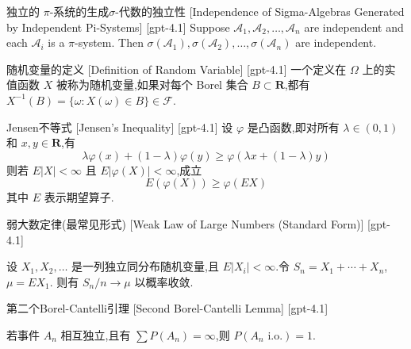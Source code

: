 \documentclass[UTF8]{ctexart}
\begin{document}
    
    
    \begin{thm}
        {独立的 $\pi$-系统的生成$\sigma$-代数的独立性}
        [Independence of Sigma-Algebras Generated by Independent Pi-Systems]
        [gpt-4.1]
        Suppose $\mathcal{A}_1, \mathcal{A}_2, \ldots, \mathcal{A}_n$ are independent and each $\mathcal{A}_i$ is a $\pi$-system. Then $\sigma(\mathcal{A}_1), \sigma(\mathcal{A}_2), \ldots, \sigma(\mathcal{A}_n)$ are independent.
    \end{thm}
    
    
    
    \begin{dfn}
        {随机变量的定义}
        [Definition of Random Variable]
        [gpt-4.1]
        一个定义在 $\Omega$ 上的实值函数 $X$ 被称为随机变量,如果对每个 Borel 集合 $B \subset \mathbf{R}$,都有 $X^{-1}(B) = \{\omega : X(\omega) \in B\} \in {\mathcal{F}}$.
    \end{dfn}
    
    
    
    \begin{thm}
        {Jensen不等式}
        [Jensen's Inequality]
        [gpt-4.1]
        设 $\varphi$ 是凸函数,即对所有 $\lambda \in (0, 1)$ 和 $x, y \in \mathbf{R}$,有
\[
\lambda \varphi(x) + (1 - \lambda)\varphi(y) \geq \varphi(\lambda x + (1 - \lambda)y)
\]
则若 $E|X| < \infty$ 且 $E|\varphi(X)| < \infty$,成立
\[
E(\varphi(X)) \geq \varphi(EX)
\]
其中 $E$ 表示期望算子.

    \end{thm}
    
    
    
    \begin{thm}
        {弱大数定律(最常见形式)}
        [Weak Law of Large Numbers (Standard Form)]
        [gpt-4.1]
        
设 $X_{1}, X_{2}, \ldots$ 是一列独立同分布随机变量,且 $E|X_{i}| < \infty$.令 $S_{n} = X_{1} + \cdots + X_{n}$,$\mu = E X_{1}$.
则有 $S_{n}/n \to \mu$ 以概率收敛.

    \end{thm}
    
    
    
    \begin{thm}
        {第二个Borel-Cantelli引理}
        [Second Borel-Cantelli Lemma]
        [gpt-4.1]
        
若事件 $A_n$ 相互独立,且有 $\sum P(A_n) = \infty$,则 $P(A_n \text{ i.o.}) = 1$.

    \end{thm}
    
\end{document}
